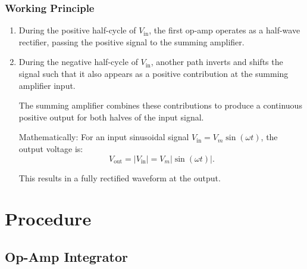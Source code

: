 \documentclass[journal]{IEEEtran}
\begin{document}
	\subsubsection*{Working Principle}
	\begin{enumerate}
	\item During the positive half-cycle of \(V_{\text{in}}\), the first op-amp operates as a half-wave rectifier, passing the positive signal to the summing amplifier.
	\item During the negative half-cycle of \(V_{\text{in}}\), another path inverts and shifts the signal such that it also appears as a positive contribution at the summing amplifier input.
	
	The summing amplifier combines these contributions to produce a continuous positive output for both halves of the input signal.
	
	Mathematically:
	For an input sinusoidal signal \(V_{\text{in}} = V_m \sin(\omega t)\),
	the output voltage is:
	\[
	V_{\text{out}} = |V_{\text{in}}| = V_m |\sin(\omega t)|.
	\]
	
	This results in a fully rectified waveform at the output.
	 \end{enumerate}

\section{Procedure}
	\subsection{Op-Amp Integrator}
	
\end{document}
